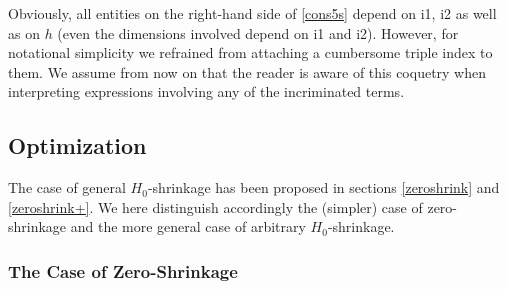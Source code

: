\documentclass[11pt]{article}
\begin{document}
Obviously, all entities on the right-hand side of \ref{cons5s} depend on i1, i2 as well as on $h$ (even the dimensions involved depend on i1 and i2). However, for notational simplicity we refrained from attaching a cumbersome triple index to them. We assume from now on that the reader is aware of this coquetry when interpreting expressions involving any of the incriminated terms. 
 
\subsection{Optimization}\label{optim_stat}

The case of general $H_0$-shrinkage has been proposed in sections \ref{zeroshrink} and \ref{zeroshrink+}. We here distinguish accordingly 
the (simpler) case of zero-shrinkage and the more general case of arbitrary $H_0$-shrinkage.

\subsubsection{The Case of Zero-Shrinkage}
\end{document}
